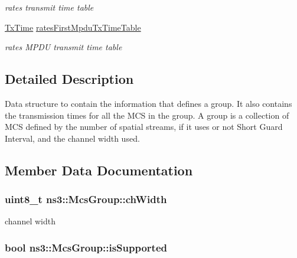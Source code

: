 \begin{DoxyCompactItemize}
\begin{DoxyCompactList}\small\item\em rates transmit time table \end{DoxyCompactList}\item 
\hyperlink{namespacens3_af8fcd77dacc9b48b88a69a7674cd8e07}{Tx\+Time} \hyperlink{structns3_1_1McsGroup_a27870f9027db266aa95dc7e572e3315f}{rates\+First\+Mpdu\+Tx\+Time\+Table}
\begin{DoxyCompactList}\small\item\em rates M\+P\+DU transmit time table \end{DoxyCompactList}\end{DoxyCompactItemize}


\subsection{Detailed Description}
Data structure to contain the information that defines a group. It also contains the transmission times for all the M\+CS in the group. A group is a collection of M\+CS defined by the number of spatial streams, if it uses or not Short Guard Interval, and the channel width used. 

\subsection{Member Data Documentation}
\subsubsection[{\texorpdfstring{ch\+Width}{chWidth}}]{\setlength{\rightskip}{0pt plus 5cm}uint8\+\_\+t ns3\+::\+Mcs\+Group\+::ch\+Width}\hypertarget{structns3_1_1McsGroup_ab314dfb9cf5c1b2c6d0e61b88caace5d}{}\label{structns3_1_1McsGroup_ab314dfb9cf5c1b2c6d0e61b88caace5d}


channel width 

\subsubsection[{\texorpdfstring{is\+Supported}{isSupported}}]{\setlength{\rightskip}{0pt plus 5cm}bool ns3\+::\+Mcs\+Group\+::is\+Supported}\hypertarget{structns3_1_1McsGroup_ae80bed20d83ea94500f6c4afddf41bfc}{}\label{structns3_1_1McsGroup_ae80bed20d83ea94500f6c4afddf41bfc}



